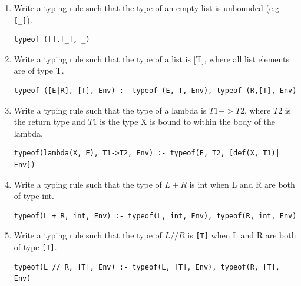 \documentclass[a4paper]{exam}
\begin{document}
\begin{enumerate}
  \item Write a typing rule such that the type of an empty list is unbounded (e.g \texttt{[\_]}).

        \begin{solution}
\begin{verbatim}   
typeof ([],[_], _)
\end{verbatim}
        \end{solution}

  \item  Write a typing rule such that the type of a list is [T], where all list elements are of type T.

        \begin{solution}
\begin{verbatim}
typeof ([E|R], [T], Env) :- typeof (E, T, Env), typeof (R,[T], Env)
\end{verbatim}
        \end{solution}

  \item Write a typing rule such that the type of a lambda is $T1->T2$, where $T2$ is the return type and $T1$ is the type X is bound to within the body of the lambda.

        \begin{solution}
\begin{verbatim}
typeof(lambda(X, E), T1->T2, Env) :- typeof(E, T2, [def(X, T1)| Env])
\end{verbatim}
        \end{solution}

  \item Write a typing rule such that the type of $L + R$ is int when L and R are both of type int.

        \begin{solution}
\begin{verbatim}
typeof(L + R, int, Env) :- typeof(L, int, Env), typeof(R, int, Env)
\end{verbatim}
        \end{solution}

  \item Write a typing rule such that the type of $L // R$ is \texttt{[T]} when L and R are both of type \texttt{[T]}.

        \begin{solution}
\begin{verbatim}
typeof(L // R, [T], Env) :- typeof(L, [T], Env), typeof(R, [T], Env)
\end{verbatim}
        \end{solution}
        

\end{enumerate}
\end{document}
